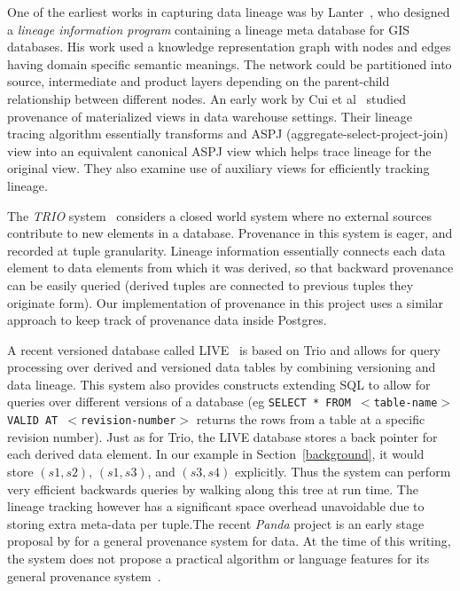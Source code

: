 
One of the earliest works in capturing data lineage was by Lanter~\cite{lanter_1991}, who designed a \textit{lineage information program} containing a lineage meta database for GIS databases. His work used a knowledge representation graph with nodes and edges having domain specific semantic meanings. The network could be partitioned into source, intermediate and product layers depending on the parent-child relationship between different nodes. An early work by Cui et al~\cite{lineage_stanford} studied provenance of materialized views in data warehouse settings. Their lineage tracing algorithm essentially transforms and ASPJ (aggregate-select-project-join) view into an equivalent canonical ASPJ view which helps trace lineage for the original view. They also examine use of auxiliary views for efficiently tracking lineage.

The \textit{TRIO} system~\cite{widom2005trio} considers a closed world system where no external sources contribute to new elements in a database. Provenance in this system is eager, and recorded at tuple granularity. Lineage information essentially connects each data element to data elements from which it was derived, so that backward provenance can be easily queried (derived tuples are connected to previous tuples they originate form). Our implementation of provenance in this project uses a similar approach to keep track of provenance data inside Postgres.

A recent versioned database called LIVE~\cite{sarma2010live} is based on Trio and allows for query processing over derived and versioned data tables by combining versioning and data lineage. This system also provides constructs extending SQL to allow for queries over different versions of a database (eg \texttt{SELECT * FROM $<$table-name$>$ VALID AT $<$revision-number$>$} returns the rows from a table at a specific revision number). Just as for Trio, the LIVE database stores a back pointer for each derived data element. In our example in Section~\ref{background}, it would store $(s1, s2)$, $(s1, s3)$, and $(s3, s4)$ explicitly. Thus the system can perform very efficient backwards queries by walking along this tree at run time. The lineage tracking however has a significant space overhead unavoidable due to storing extra meta-data per tuple.The recent \textit{Panda} project is an early stage proposal by for a general provenance system for data. At the time of this writing, the system does not propose a practical algorithm or language features for its general provenance system~\cite{ikeda2010panda}.

